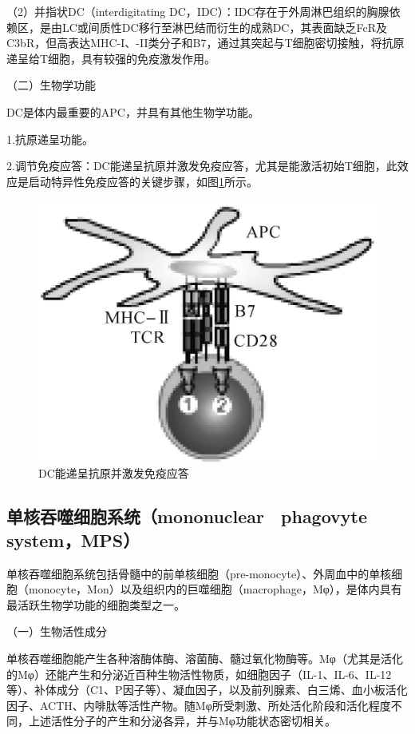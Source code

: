 （2）并指状DC（interdigitating
DC，IDC）：IDC存在于外周淋巴组织的胸腺依赖区，是由LC或间质性DC移行至淋巴结而衍生的成熟DC，其表面缺乏FcR及C3bR，但高表达MHC-I、-II类分子和B7，通过其突起与T细胞密切接触，将抗原递呈给T细胞，具有较强的免疫激发作用。

（二）生物学功能

DC是体内最重要的APC，并具有其他生物学功能。

1.抗原递呈功能。

2.调节免疫应答：DC能递呈抗原并激发免疫应答，尤其是能激活初始T细胞，此效应是启动特异性免疫应答的关键步骤，如图\ref{fig9-4}所示。

\begin{figure}[!htbp]
 \centering
 \includegraphics{./images/Image00130.jpg}
 \captionsetup{justification=centering}
 \caption{DC能递呈抗原并激发免疫应答}
 \label{fig9-4}
  \end{figure} 


\subsection{单核吞噬细胞系统（mononuclear　phagovyte　system，MPS）}

单核吞噬细胞系统包括骨髓中的前单核细胞（pre-monocyte）、外周血中的单核细胞（monocyte，Mon）以及组织内的巨噬细胞（macrophage，Mφ），是体内具有最活跃生物学功能的细胞类型之一。

（一）生物活性成分

单核吞噬细胞能产生各种溶酶体酶、溶菌酶、髓过氧化物酶等。Mφ（尤其是活化的Mφ）还能产生和分泌近百种生物活性物质，如细胞因子（IL-1、IL-6、IL-12等）、补体成分（C1、P因子等）、凝血因子，以及前列腺素、白三烯、血小板活化因子、ACTH、内啡肽等活性产物。随Mφ所受刺激、所处活化阶段和活化程度不同，上述活性分子的产生和分泌各异，并与Mφ功能状态密切相关。

